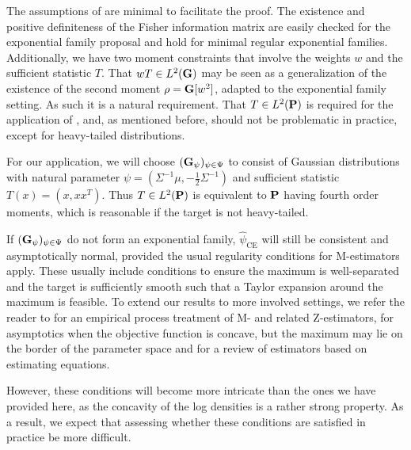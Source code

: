 The assumptions of  are minimal to facilitate the proof. The existence and positive definiteness of the Fisher information matrix are easily checked for the exponential family proposal and hold for minimal regular exponential families. Additionally, we have two moment constraints that involve the weights $w$ and the sufficient statistic $T$. That $wT \in L^{2}(\G)$ may be seen as a generalization of the existence of the second moment $\rho = \G [w^{2}]$, adapted to the exponential family setting. As such it is a natural requirement. That $T\in L^{2}(\P)$ is required for the application of , and, as mentioned before, should not be problematic in practice, except for heavy-tailed distributions.

For our application, we will choose $(\G_{\psi})_{\psi \in \Psi}$ to consist of Gaussian distributions with natural parameter $\psi = \left( \Sigma^{-1}\mu, -\frac{1}{2}\Sigma^{-1}\right)$ and sufficient statistic $T(x) = \left( x, xx^{T} \right)$. Thus $T\in L^{2}(\P)$ is equivalent to $\P$ having fourth order moments, which is reasonable if the target is not heavy-tailed.

If $(\G_\psi)_{\psi \in \Psi}$ do not form an exponential family, $\hat\psi_{\text{CE}}$ will still be consistent and asymptotically normal, provided the usual regularity conditions for M-estimators apply.
These usually include conditions to ensure the maximum is well-separated and the target is sufficiently smooth such that a Taylor expansion around the maximum is feasible.
To extend our results to more involved settings, we refer the reader to \citep{VanderVaart2000Asymptotic} for an empirical process treatment of M- and related Z-estimators, \citep{Haberman1989Concavity} for asymptotics when the objective function is concave, but the maximum may lie on the border of the parameter space and \citep{Liang1995Inference} for a review of estimators based on estimating equations.

However, these conditions will become more intricate than the ones we have provided here, as the concavity of the log densities is a rather strong property. As a result, we expect that assessing whether these conditions are satisfied in practice be more difficult. 
